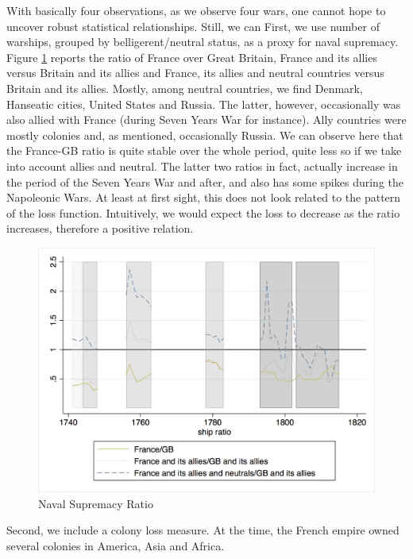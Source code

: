 \documentclass[12pt,a4paper,notitlepage,english]{article}
\begin{document}
With basically four observations, as we observe four wars, one cannot hope to uncover robust statistical relationships. Still, we can 
First, we use number of warships, grouped by belligerent/neutral status, as a proxy for naval supremacy. Figure \ref{naval_supremacy_ratios} reports the ratio of France over Great Britain, France and its allies versus Britain and its allies and France, its allies and neutral countries versus Britain and its allies.
Mostly, among neutral countries, we find Denmark, Hanseatic cities, United States and Russia.
The latter, however, occasionally was also allied with France (during Seven Years War for instance).
Ally countries were mostly colonies and, as mentioned, occasionally Russia.
We can observe here that the France-GB ratio is quite stable over the whole period, quite less so if we take into account allies and neutral.
The latter two ratios in fact, actually increase in the period of the Seven Years War and after, and also has some spikes during the Napoleonic Wars.
At least at first sight, this does not look related to the pattern of the loss function.
Intuitively, we would expect the loss to decrease as the ratio increases, therefore a positive relation.
\begin{center}
\begin{figure}[H]
\caption{Naval Supremacy Ratio}
\label{naval_supremacy_ratios}
\centering
\includegraphics[scale=.51]{naval_supremacy_ratios.png}
\end{figure}
\end{center}
Second, we include a colony loss measure.
At the time, the French empire owned several colonies in America, Asia and Africa.
\end{document}
